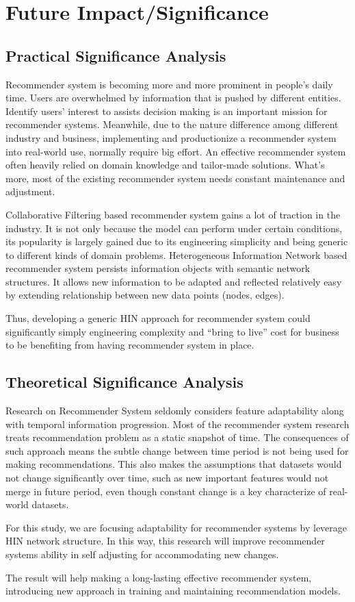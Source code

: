 \section{Future Impact/Significance}

\subsection{Practical Significance Analysis}
Recommender system is becoming more and more prominent in people's daily time. Users are overwhelmed by information that is pushed by different entities. Identify users' interest to assists decision making is an important mission for recommender systems. Meanwhile, due to the nature difference among different industry and business, implementing and productionize a recommender system into real-world use, normally require big effort. An effective recommender system often heavily relied on domain knowledge and tailor-made solutions. What's more, most of the existing recommender system needs constant maintenance and adjustment.  

Collaborative Filtering based recommender system gains a lot of traction in the industry. It is not only because the model can perform under certain conditions, its popularity is largely gained due to its engineering simplicity and being generic to different kinds of domain problems. Heterogeneous Information Network based recommender system persists information objects with semantic network structures. It allows new information to be adapted and reflected relatively easy by extending relationship between new data points (nodes, edges).  

Thus, developing a generic HIN approach for recommender system could significantly simply engineering complexity and “bring to live” cost for business to be benefiting from having recommender system in place. 

\subsection{Theoretical Significance Analysis}
Research on Recommender System seldomly considers feature adaptability along with temporal information progression. Most of the recommender system research treats recommendation problem as a static snapshot of time. The consequences of such approach means the subtle change between time period is not being used for making recommendations. This also makes the assumptions that datasets would not change significantly over time, such as new important features would not merge in future period, even though constant change is a key characterize of real-world datasets. 

For this study, we are focusing adaptability for recommender systems by leverage HIN network structure. In this way, this research will improve recommender systems ability in self adjusting for accommodating new changes. 

The result will help making a long-lasting effective recommender system, introducing new approach in training and maintaining recommendation models. 


